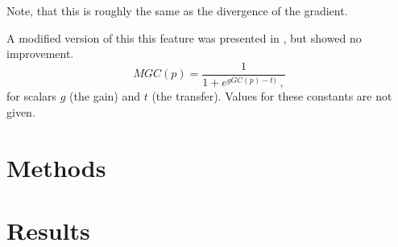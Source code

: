 \documentclass[12pt]{book}
\begin{document}
\par Note, that this is roughly the same as the
divergence of the gradient.  

\par A modified version of this this
feature was presented in \cite{NappiY03}, but showed no improvement.
\[
MGC(p) = \frac{1}{1+e^{g GC(p)-t)} \; ,}
\]
for scalars $g$ (the gain) and $t$ (the transfer). Values for these
constants are not given.

\chapter{Methods}


\chapter{Results}


%
\clearpage


\end{document}
